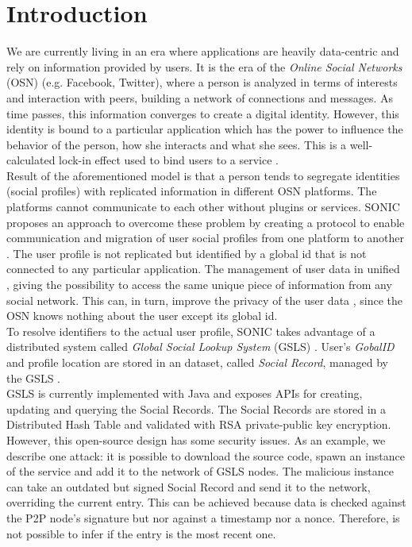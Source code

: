 \section{Introduction}
\label{S:1}

We are currently living in an era where applications are heavily data-centric and rely on information provided by users. It is the era of the \textit{Online Social Networks} (OSN) \cite{gondor_sonic:_2014} (e.g. Facebook, Twitter), where a person is analyzed in terms of interests and interaction with peers, building a network of connections and messages. As time passes, this information converges to create a digital identity. However, this identity is bound to a particular application which has the power to influence the behavior of the person, how she interacts and what she sees. This is a well-calculated lock-in effect used to bind users to a service \cite{gondor_distributed_2016}. 
\\

Result of the aforementioned model is that a person tends to segregate identities (social profiles) with replicated information in different OSN platforms. The platforms cannot communicate to each other without plugins or services. SONIC proposes an approach to overcome these problem by creating a protocol to enable communication and migration of user social profiles from one platform to another \cite{gondor_sonic:_2014}. The user profile is not replicated but identified by a global id that is not connected to any particular application. The management of user data in unified \cite{identity_mgmt_2003}, giving the possibility to access the same unique piece of information from any social network. This can, in turn, improve the privacy of the user data
, since the OSN knows nothing about the user except its global id.
\\

To resolve identifiers to the actual user profile, SONIC takes advantage of a distributed system called \textit{Global Social Lookup System} (GSLS) \cite{gondor_distributed_2016}. User's \textit{GobalID} and profile location are stored in an dataset, called \textit{Social Record}, managed by the GSLS \cite{gondor_distributed_2016}.
\\

GSLS is currently implemented with Java and exposes APIs for creating, updating and querying the Social Records. The Social Records are stored in a Distributed Hash Table \cite{tomp2p_2009} and validated with RSA private-public key encryption. However, this open-source design has some security issues. As an example, we describe one attack: it is possible to download the source code, spawn an instance of the service and add it to the network of GSLS nodes. The malicious instance can take an outdated but signed Social Record and send it to the network, overriding the current entry. This can be achieved because data is checked against the P2P node's signature but nor against a timestamp nor a nonce. Therefore, is not possible to infer if the entry is the most recent one. 
\\

